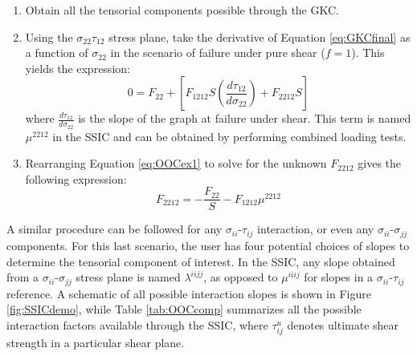 \documentclass[main.tex]{subfiles}
\begin{document}
\begin{enumerate}
	\item Obtain all the tensorial components possible through the GKC.
	\item Using the $\sigma_{22}$\textendash$\tau_{12}$ stress plane, take the derivative of Equation \ref{eq:GKCfinal} as a function of $\sigma_{22}$ in the scenario of failure under pure shear ($f=1$). This yields the expression:
	\begin{equation} \label{eq:OOCex1}
	 0= F_{22}+[F_{1212}S(\frac{d\tau_{12}}{d\sigma_{22}})+F_{2212}S]
	\end{equation}
	 where $\frac{d\tau_{12}}{d\sigma_{22}}$  is the slope of the graph at failure under shear. This term is named $\mu^{2212}$ in the SSIC and can be obtained by performing combined loading tests. 
	 
	\item Rearranging Equation \ref{eq:OOCex1} to solve for the unknown $F_{2212}$ gives the following expression:
	\begin{equation} \label{eq:OOCex2}
	F_{2212}=-\frac{F_{22}}{S}-F_{1212}\mu^{2212}
	\end{equation}
\end{enumerate}


A similar procedure can be followed for any $\sigma_{ii}$-$\tau_{ij}$ interaction, or even any $\sigma_{ii}$-$\sigma_{jj}$ components. For this last scenario, the user has four potential choices of slopes to determine the tensorial component of interest. In the SSIC, any slope obtained from a $\sigma_{ii}$-$\sigma_{jj}$ stress plane is named $\lambda^{iijj}$, as opposed to $\mu^{iiij}$ for slopes in a $\sigma_{ii}$-$\tau_{ij}$ reference. A schematic of all possible interaction slopes is shown in Figure \ref{fig:SSICdemo}, while Table \ref{tab:OOCcomp} summarizes all the possible interaction factors available through the SSIC, where $\tau_{ij}^u$ denotes ultimate shear strength in a particular shear plane. 
\end{document}
